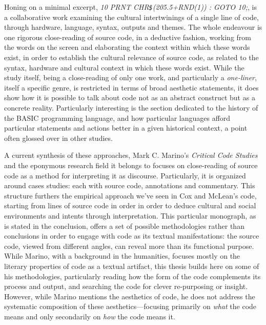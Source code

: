 Honing on a minimal excerpt, \emph{10 PRNT CHR\lstinline{$}(205.5+RND(1)) : GOTO 10;}\cite{montfort_10_2014}, is a collaborative work examining the cultural intertwinings of a single line of code, through hardware, language, syntax, outputs and themes. The whole endeavour is one rigorous close-reading of source code, in a deductive fashion, working from the words on the screen and elaborating the context within which these words exist, in order to establish the cultural relevance of source code, as related to the syntax, hardware and cultural context in which these words exist. While the study itself, being a close-reading of only one work, and particularly a \emph{one-liner}, itself a specific genre, is restricted in terms of broad aesthetic statements, it does show how it is possible to talk about code not as an abstract construct but as a concrete reality. Particularly interesting is the section dedicated to the history of the BASIC programming language, and how particular languages afford particular statements and actions better in a given historical context, a point often glossed over in other studies.

A current synthesis of these approaches, Mark C. Marino's \emph{Critical Code Studies}\cite{marino_critical_2020} and the eponymous research field it belongs to focuses on close-reading of source code as a method for interpreting it as discourse. Particularly, it is organized around cases studies: each with source code, annotations and commentary. This structure furthers the empirical approach we've seen in Cox and McLean's code, starting from lines of source code in order in order to deduce cultural and social environments and intents through interpretation. This particular monograph, as is stated in the conclusion, offers a set of possible methodologies rather than conclusions in order to engage with code as its textual manifestations: the source code, viewed from different angles, can reveal more than its functional purpose. While Marino, with a background in the humanities, focuses mostly on the literary properties of code as a textual artifact, this thesis builds here on some of his methodologies, particularly reading how the form of the code complements its process and output, and searching the code for clever re-purposing or insight. However, while Marino mentions the aesthetics of code, he does not address the systematic composition of these aesthetics—focusing primarily on \emph{what} the code means and only secondarily on \emph{how} the code means it.

